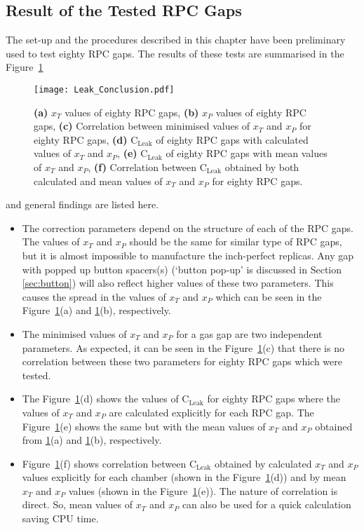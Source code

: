 \subsection{Result of the Tested RPC Gaps}
The set-up and the procedures described in this chapter have been preliminary
used to test eighty RPC gaps. The results of these tests are summarised in the
Figure~\ref{fig:conclusion}
\begin{figure}[h]
  \centering
  \texttt{[image: Leak\_Conclusion.pdf]}
  \caption{\textbf{(a)} $x_T$ values of eighty RPC gaps,
    \textbf{(b)} $x_P$ values of eighty RPC gaps,
    \textbf{(c)} Correlation between minimised values of $x_T$ and $x_P$
    for eighty RPC gaps,
    \textbf{(d)} $\textrm{C}_{\textrm{Leak}}$ of eighty RPC gaps with calculated
    values of $x_T$ and $x_P$,
    \textbf{(e)} $\textrm{C}_{\textrm{Leak}}$ of eighty RPC gaps with mean
    values of $x_T$ and $x_P$,
    \textbf{(f)} Correlation between $\textrm{C}_{\textrm{Leak}}$ obtained by
    both calculated and mean values of $x_T$ and $x_P$ for eighty RPC gaps.}
  \label{fig:conclusion}
\end{figure}
and general findings are listed here.
\begin{itemize} \itemsep -3pt
\item The correction parameters depend on the structure of each of the RPC
  gaps. The values of $x_T$ and $x_P$ should be the same for similar type of RPC
  gaps, but it is almost impossible to manufacture the inch-perfect replicas.
  Any gap with popped up button spacers(s) (`button pop-up' is discussed in
  Section \ref{sec:button}) will also reflect higher values of these two
  parameters. This causes the spread in the values of $x_T$ and $x_P$ which
  can be seen in the Figure~\ref{fig:conclusion}(a) and
  \ref{fig:conclusion}(b), respectively.
\item The minimised values of $x_T$ and $x_P$ for a gas gap are two independent
  parameters. As expected, it can be seen in the Figure~\ref{fig:conclusion}(c)
  that there is no correlation between these two parameters for eighty RPC gaps
  which were tested.
\item The Figure~\ref{fig:conclusion}(d) shows the values of
  $\textrm{C}_{\textrm{Leak}}$ for eighty RPC gaps where the values of $x_T$ and
  $x_P$ are calculated explicitly for each RPC gap. The
  Figure~\ref{fig:conclusion}(e) shows the same but with the mean values of
  $x_T$ and $x_P$ obtained from \ref{fig:conclusion}(a) and
  \ref{fig:conclusion}(b), respectively.
\item Figure~\ref{fig:conclusion}(f) shows correlation between
  $\textrm{C}_{\textrm{Leak}}$ obtained by calculated $x_T$ and $x_P$ values
  explicitly for each chamber (shown in the Figure~\ref{fig:conclusion}(d))
  and by mean $x_T$ and $x_P$ values (shown in the
  Figure~\ref{fig:conclusion}(e)). The nature of correlation is direct.
  So, mean values of $x_T$ and $x_P$ can also be used for a quick calculation
  saving CPU time.
\end{itemize}

